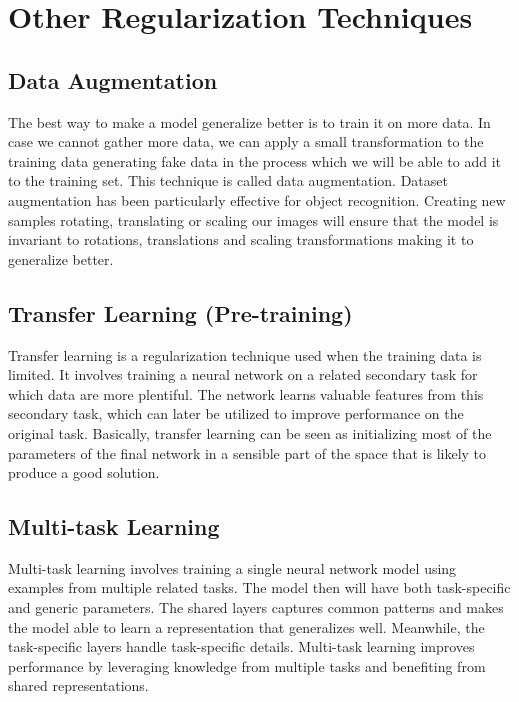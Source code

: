 \section{Other Regularization Techniques}

\subsection{Data Augmentation}

The best way to make a model generalize better is to train it on more data. In case we cannot gather more data, we can apply a small transformation to the training data generating fake data in the process which we will be able to add it to the training set. This technique is called data augmentation. Dataset augmentation has been particularly effective for object recognition. Creating new samples rotating, translating or scaling our images will ensure that the model is invariant to rotations, translations and scaling transformations making it to generalize better.


\subsection{Transfer Learning (Pre-training)}

Transfer learning is a regularization technique used when the training data is limited. It involves training a neural network on a related secondary task for which data are more plentiful. The network learns valuable features from this secondary task, which can later be utilized to improve performance on the original task. Basically, transfer learning can be seen as initializing most of the parameters of the final network in a sensible part of the space that is likely to produce a good solution.

\newpage

\subsection{Multi-task Learning}

Multi-task learning involves training a single neural network model using examples from multiple related tasks. The model then will have both task-specific and generic parameters. The shared layers captures common patterns and makes the model able to learn a representation that generalizes well.
Meanwhile, the task-specific layers handle task-specific details. Multi-task learning improves performance by leveraging knowledge from multiple tasks and benefiting from shared representations.

